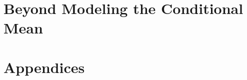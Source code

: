 \documentclass[krantz2]{krantz}
\begin{document}
 
        \part{Beyond Modeling the Conditional Mean}
            
              


\appendix  

\part{Appendices}

        
%         
        
        
                
 
 



\printindex
\end{document}
